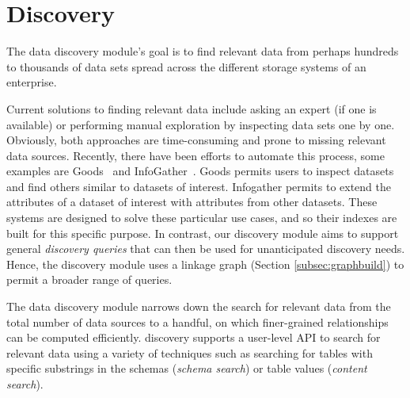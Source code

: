 \section{Discovery}
\label{sec:discovery}

The data discovery module's goal is to find relevant data from perhaps hundreds
to thousands of data sets  spread across the different storage systems of an
enterprise.

Current solutions to finding relevant data include asking an expert (if one is
available) or  performing manual exploration by inspecting data sets one by one.
Obviously, both approaches are time-consuming and prone to missing relevant data
sources. Recently, there have been efforts to automate this process, some
examples are Goods~\cite{DBLP:conf/sigmod/HalevyKNOPRW16} and
InfoGather~\cite{DBLP:conf/sigmod/YakoutGCC12}. Goods permits users to inspect
datasets and find others similar to datasets of interest. Infogather permits to
extend the attributes of a dataset of interest with attributes from other
datasets. These systems are designed to solve these particular use cases, and so
their indexes are built for this specific purpose. In
contrast, our discovery module aims to support general \emph{discovery queries} that
can then be used for unanticipated discovery needs. Hence, the discovery module
uses a linkage graph (Section \ref{subsec:graphbuild}) to permit a broader range
of queries. 


%


The data discovery module narrows down the search for relevant data from
the total number of data sources to a handful, on which finer-grained
relationships can be computed efficiently. \dcv discovery supports a
user-level API to search for relevant data using a variety of techniques such as
searching for tables with specific substrings in the schemas ({\it schema
search}) or table values ({\it content search}). 

